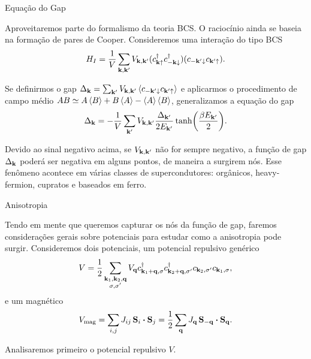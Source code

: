 \documentclass[8pt,aspectratio=169,xcolor={table,dvipsnames,usenames}]{beamer}
\begin{document}


\begin{frame}{Equação do Gap}

Aproveitaremos parte do formalismo da teoria BCS. O raciocínio ainda se baseia na formação de pares de Cooper. Consideremos uma interação do tipo BCS
$$
H_I =
\frac{1}{V} \sum_{\vb{k},\vb{k}'} V_{\vb{k},\vb{k}'} (c_{\vb{k}\uparrow}^\dagger c_{-\vb{k}\downarrow}^\dagger) (c_{-\vb{k}'\downarrow} c_{\vb{k}'\uparrow}).
$$

Se definirmos o gap $\Delta_{\k} = \sum_{\k'} V_{\k,\k'} \ev{c_{-\k'\down} c_{\k'\up}}$ e aplicarmos o procedimento de campo médio $AB \simeq A\ev{B} + B\ev{A} - \ev{A}\ev{B}$, generalizamos a equação do gap
\begin{equation} \label{eq:gapeq}
\Delta_{\vb{k}} = - \frac{1}{V} \sum_{\vb{k}'} V_{\vb{k},\vb{k}'} \frac{\Delta_{\vb{k}'}}{2 E_{\vb{k}'}} \tanh(\frac{\beta E_{\vb{k}'}}{2}).
\end{equation}

Devido ao sinal negativo acima, se $V_{\vb{k},\vb{k}'}$ não for sempre negativo, a função de gap $\Delta_{\vb{k}}$ poderá ser negativa em alguns pontos, de maneira a surgirem nós. Esse fenômeno acontece em várias classes de supercondutores: orgânicos, heavy-fermion, cupratos e baseados em ferro.

\end{frame}



\begin{frame}{Anisotropia}

Tendo em mente que queremos capturar os nós da função de gap, faremos considerações gerais sobre potenciais para estudar como a anisotropia pode surgir. Consideremos dois potenciais, um potencial repulsivo genérico
$$
V = \frac{1}{2} \sum_{\substack{\vb{k}_1,\vb{k}_2,\vb{q} \\ \sigma, \sigma'}} V_{\vb{q}} c_{\vb{k}_1+\vb{q},\sigma}^\dagger c_{\vb{k}_2+\vb{q},\sigma'}^\dagger c_{\vb{k}_2,\sigma'} c_{\vb{k}_1,\sigma},
$$
e um magnético
$$
V_{\text{mag}} = \sum_{i,j} J_{ij} \, \vb{S}_i \vdot \vb{S}_j = \frac{1}{2} \sum_{\q} J_{\q} \, \vb{S}_{-\q} \vdot \vb{S}_{\q}.
$$

\n

Analisaremos primeiro o potencial repulsivo $V$.

\end{frame}

\end{document}
